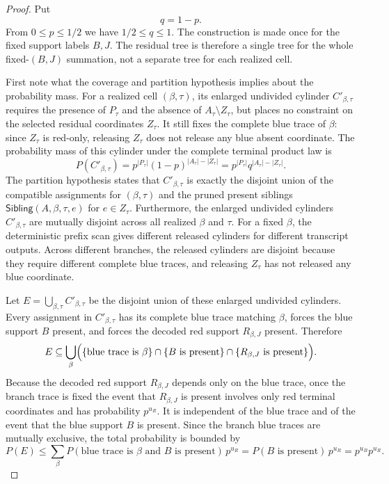 \begin{proof}
Put
\[
q=1-p.
\]
From \(0\le p\le1/2\) we have \(1/2\le q\le1\).  The construction is made
once for the fixed support labels \(B,J\).  The residual tree is therefore a
single tree for the whole fixed-\((B,J)\) summation, not a separate tree for
each realized cell.

First note what the coverage and partition hypothesis implies about the
probability mass.  For a realized cell \((\beta,\tau)\), its enlarged
undivided cylinder \(C'_{\beta,\tau}\) requires the presence of \(P_\tau\)
and the absence of \(A_\tau\setminus Z_\tau\), but places no constraint on
the selected residual coordinates \(Z_\tau\).  It still fixes the complete
blue trace of \(\beta\): since \(Z_\tau\) is red-only, releasing \(Z_\tau\)
does not release any blue absent coordinate.  The probability mass of this
cylinder under the complete terminal product law is
\[
P(C'_{\beta,\tau})
 = p^{|P_\tau|}(1-p)^{|A_\tau|-|Z_\tau|}
 = p^{|P_\tau|}q^{|A_\tau|-|Z_\tau|}.
\]
The partition hypothesis states that \(C'_{\beta,\tau}\) is exactly the
disjoint union of the compatible assignments for \((\beta,\tau)\) and the
pruned present siblings \(\mathsf{Sibling}(A,\beta,\tau,e)\) for
\(e\in Z_\tau\).  Furthermore, the enlarged undivided cylinders
\(C'_{\beta,\tau}\) are mutually disjoint across all realized \(\beta\) and
\(\tau\).  For a fixed \(\beta\), the deterministic prefix scan gives
different released cylinders for different transcript outputs.  Across
different branches, the released cylinders are disjoint because they require
different complete blue traces, and releasing \(Z_\tau\) has not released any
blue coordinate.

Let \(E=\bigcup_{\beta,\tau}C'_{\beta,\tau}\) be the disjoint union of these
enlarged undivided cylinders.  Every assignment in \(C'_{\beta,\tau}\) has
its complete blue trace matching \(\beta\), forces the blue support \(B\)
present, and forces the decoded red support \(R_{\beta,J}\) present.
Therefore
\[
E \subseteq \bigcup_{\beta} \Bigl( \{\text{blue trace is } \beta\} \cap \{B \text{ is present}\} \cap \{R_{\beta,J} \text{ is present}\} \Bigr).
\]
Because the decoded red support \(R_{\beta,J}\) depends only on the blue
trace, once the branch trace is fixed the event that \(R_{\beta,J}\) is
present involves only red terminal coordinates and has probability
\(p^{u_R}\).  It is independent of the blue trace and of the event that the
blue support \(B\) is present.  Since the branch blue traces are mutually
exclusive, the total probability is bounded by
\[
P(E)
\le \sum_{\beta}
  P(\text{blue trace is } \beta \text{ and } B \text{ is present})\,p^{u_R}
= P(B \text{ is present})\,p^{u_R}
= p^{u_B}p^{u_R}.
\]


\end{proof}
